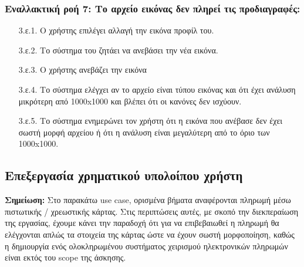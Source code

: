 \documentclass[12pt,a4paper]{article}
\begin{document}
\subsubsection*{Εναλλακτική ροή 7: Το αρχείο εικόνας δεν πληρεί τις προδιαγραφές:}
\begin{enumerate}
    \item [3.ε.1.] Ο χρήστης επιλέγει αλλαγή την εικόνα προφίλ του.
    \item [3.ε.2.] Το σύστημα του ζητάει να ανεβάσει την νέα εικόνα.
    \item [3.ε.3.] Ο χρήστης ανεβάζει την εικόνα
    \item [3.ε.4.] Το σύστημα ελέγχει αν το αρχείο είναι τύπου εικόνας και ότι έχει ανάλυση μικρότερη από 1000x1000 και βλέπει ότι οι κανόνες δεν ισχύουν.
    \item [3.ε.5.] Το σύστημα ενημερώνει τον χρήστη ότι η εικόνα που ανέβασε δεν έχει σωστή μορφή αρχείου ή ότι η ανάλυση είναι μεγαλύτερη από το όριο των 1000x1000.
\end{enumerate}

\subsection{Επεξεργασία χρηματικού υπολοίπου χρήστη}

\textbf{Σημείωση:} Στο παρακάτω use case, ορισμένα βήματα αναφέρονται πληρωμή μέσω πιστωτικής / χρεωστικής κάρτας. Στις περιπτώσεις αυτές, με σκοπό την διεκπεραίωση της εργασίας, έχουμε κάνει την παραδοχή ότι για να επιβεβαιωθεί η πληρωμή θα ελέγχονται απλώς τα στοιχεία της κάρτας ώστε να έχουν σωστή μορφοποίηση, καθώς η δημιουργία ενός ολοκληρωμένου συστήματος χειρισμού ηλεκτρονικών πληρωμών είναι εκτός του scope της άσκησης.
\end{document}
